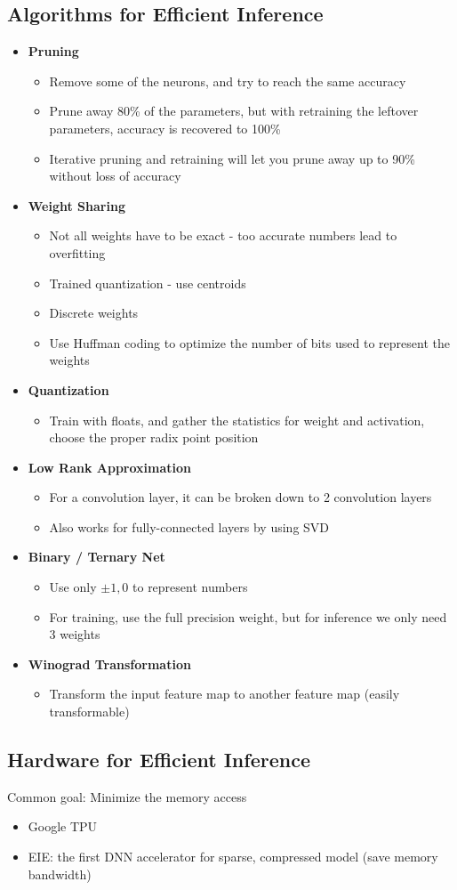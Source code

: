 \subsection{Algorithms for Efficient Inference}
\begin{itemize}
	\item \textbf{Pruning}
	\begin{itemize}
		\item Remove some of the neurons, and try to reach the same accuracy
		\item Prune away 80\% of the parameters, but with retraining the leftover parameters, accuracy is recovered to 100\%
		\item Iterative pruning and retraining will let you prune away up to 90\% without loss of accuracy
	\end{itemize}
	\item \textbf{Weight Sharing}
	\begin{itemize}
		\item Not all weights have to be exact - too accurate numbers lead to overfitting
		\item Trained quantization - use centroids
		\item Discrete weights
		\item Use Huffman coding to optimize the number of bits used to represent the weights
	\end{itemize}
	\item \textbf{Quantization}
	\begin{itemize}
		\item Train with floats, and gather the statistics for weight and activation, choose the proper radix point position
	\end{itemize}
	\item \textbf{Low Rank Approximation}
	\begin{itemize}
		\item For a convolution layer, it can be broken down to 2 convolution layers
		\item Also works for fully-connected layers by using SVD
	\end{itemize}
	\item \textbf{Binary / Ternary Net}
	\begin{itemize}
		\item Use only $\pm 1, 0$ to represent numbers
		\item For training, use the full precision weight, but for inference we only need 3 weights
	\end{itemize}
	\item \textbf{Winograd Transformation}
	\begin{itemize}
		\item Transform the input feature map to another feature map (easily transformable)
	\end{itemize}
\end{itemize}

\subsection{Hardware for Efficient Inference}
Common goal: Minimize the memory access
\begin{itemize}
	\item Google TPU
	\item EIE: the first DNN accelerator for sparse, compressed model (save memory bandwidth)
\end{itemize}
